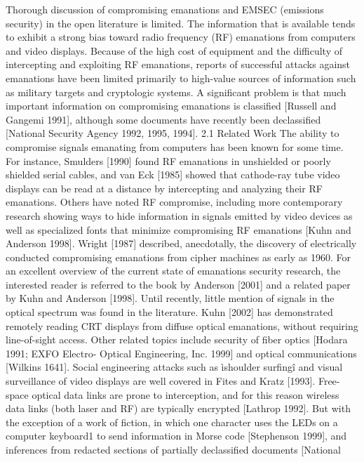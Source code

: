Thorough discussion of compromising emanations and EMSEC (emissions 
security) in the open literature is limited. The information that is available 
tends to exhibit a strong bias toward radio frequency (RF) emanations from 
computers and video displays. Because of the high cost of equipment and the 
difficulty of intercepting and exploiting RF emanations, reports of successful 
attacks against emanations have been limited primarily to high-value sources 
of information such as military targets and cryptologic systems. A significant 
problem is that much important information on compromising emanations is 
classified [Russell and Gangemi 1991], although some documents have recently 
been declassified [National Security Agency 1992, 1995, 1994]. 
2.1 Related Work 
The ability to compromise signals emanating from computers has been known 
for some time. For instance, Smulders [1990] found RF emanations in unshielded 
or poorly shielded serial cables, and van Eck [1985] showed that 
cathode-ray tube video displays can be read at a distance by intercepting and 
analyzing their RF emanations. Others have noted RF compromise, including 
more contemporary research showing ways to hide information in signals emitted 
by video devices as well as specialized fonts that minimize compromising RF 
emanations [Kuhn and Anderson 1998]. Wright [1987] described, anecdotally, 
the discovery of electrically conducted compromising emanations from cipher 
machines as early as 1960. For an excellent overview of the current state of 
emanations security research, the interested reader is referred to the book by 
Anderson [2001] and a related paper by Kuhn and Anderson [1998]. 
Until recently, little mention of signals in the optical spectrum was found in 
the literature. Kuhn [2002] has demonstrated remotely reading CRT displays 
from diffuse optical emanations, without requiring line-of-sight access. Other 
related topics include security of fiber optics [Hodara 1991; EXFO Electro- 
Optical Engineering, Inc. 1999] and optical communications [Wilkins 1641]. 
Social engineering attacks such as ìshoulder surfingî and visual surveillance 
of video displays are well covered in Fites and Kratz [1993]. Free-space optical 
data links are prone to interception, and for this reason wireless data 
links (both laser and RF) are typically encrypted [Lathrop 1992]. But with the 
exception of a work of fiction, in which one character uses the LEDs on a computer 
keyboard1 to send information in Morse code [Stephenson 1999], and 
inferences from redacted sections of partially declassified documents [National 
